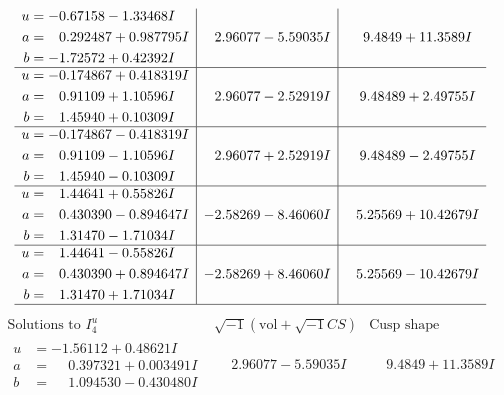 \documentclass[1p]{elsarticle_modified}
\theoremstyle{definition}
\newcommand{\I}{\sqrt{-1}}
\begin{document}
$$\begin{array}{c|c|c}
\begin{aligned}
u &= -0.67158 - 1.33468 I \\
a &= \phantom{-}0.292487 + 0.987795 I \\
b &= -1.72572 + 0.42392 I\end{aligned}
 & \phantom{-}2.96077 - 5.59035 I & \phantom{-}9.4849 + 11.3589 I \\ \hline\begin{aligned}
u &= -0.174867 + 0.418319 I \\
a &= \phantom{-}0.91109 + 1.10596 I \\
b &= \phantom{-}1.45940 + 0.10309 I\end{aligned}
 & \phantom{-}2.96077 - 2.52919 I & \phantom{-}9.48489 + 2.49755 I \\ \hline\begin{aligned}
u &= -0.174867 - 0.418319 I \\
a &= \phantom{-}0.91109 - 1.10596 I \\
b &= \phantom{-}1.45940 - 0.10309 I\end{aligned}
 & \phantom{-}2.96077 + 2.52919 I & \phantom{-}9.48489 - 2.49755 I \\ \hline\begin{aligned}
u &= \phantom{-}1.44641 + 0.55826 I \\
a &= \phantom{-}0.430390 - 0.894647 I \\
b &= \phantom{-}1.31470 - 1.71034 I\end{aligned}
 & -2.58269 - 8.46060 I & \phantom{-}5.25569 + 10.42679 I \\ \hline\begin{aligned}
u &= \phantom{-}1.44641 - 0.55826 I \\
a &= \phantom{-}0.430390 + 0.894647 I \\
b &= \phantom{-}1.31470 + 1.71034 I\end{aligned}
 & -2.58269 + 8.46060 I & \phantom{-}5.25569 - 10.42679 I\\
 \hline 
 \end{array}$$\newpage$$\begin{array}{c|c|c}  
\text{Solutions to }I^u_{4}& \I (\text{vol} + \sqrt{-1}CS) & \text{Cusp shape}\\
 \hline 
\begin{aligned}
u &= -1.56112 + 0.48621 I \\
a &= \phantom{-}0.397321 + 0.003491 I \\
b &= \phantom{-}1.094530 - 0.430480 I\end{aligned}
 & \phantom{-}2.96077 - 5.59035 I & \phantom{-}9.4849 + 11.3589 I \\ \hline\begin{aligned}

\end{aligned}
\end{array}$$
\end{document}
